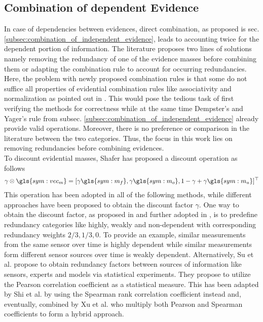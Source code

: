 \subsection{Combination of dependent Evidence}
\label{subsec:combination_of_dependent_evidence}
In case of dependencies between evidences, direct combination, as proposed is sec. \ref{subsec:combination_of_independent_evidence}, leads to accounting twice for the dependent portion of information. The literature proposes two lines of solutions namely removing the redundancy of one of the evidence masses before combining them or adapting the combination rule to account for occurring redundancies. Here, the problem with newly proposed combination rules is that some do not suffice all properties of evidential combination rules like associativity and normalization as pointed out in \cite{cattaneo2011belief}. This would pose the tedious task of first verifying the methods for correctness while at the same time Dempster's and Yager's rule from subsec. \ref{subsec:combination_of_independent_evidence} already provide valid operations. Moreover, there is no preference or comparison in the literature between the two categories. Thus, the focus in this work lies on removing redundancies before combining evidences.\\
To discount evidential masses, Shafer \cite{shafer1976mathematical} has proposed a discount operation as follows
\begin{align}
	\label{eq:discount_op}
	\gamma \otimes \gls{sym:vec_m} = [\gamma \gls{sym:m_f}, \gamma \gls{sym:m_o}, 1-\gamma+\gamma\gls{sym:m_u}]^\top
\end{align}
This operation has been adopted in all of the following methods, while different approaches have been proposed to obtain the discount factor $\gamma$.
%
One way to obtain the discount factor, as proposed in \cite{jiang2009combination} and further adopted in \cite{guralnik2006handling}, is to predefine redundancy categories like highly, weakly and non-dependent with corresponding redundancy weights $2/3, 1/3, 0$. To provide an example, similar measurements from the same sensor over time is highly dependent while similar measurements form different sensor sources over time is weakly dependent. 
%
Alternatively, Su et al. \cite{su2015handling} propose to obtain redundancy factors between sources of information like sensors, experts and models via statistical experiments. They propose to utilize the Pearson correlation coefficient \cite{benesty2009pearson} as a statistical measure. This has been adapted by Shi et al. \cite{shi2017research} by using the Spearman rank correlation coefficient instead and, eventually, combined by Xu et al. \cite{xu2017dependent} who multiply both Pearson and Spearman coefficients to form a hybrid approach.
